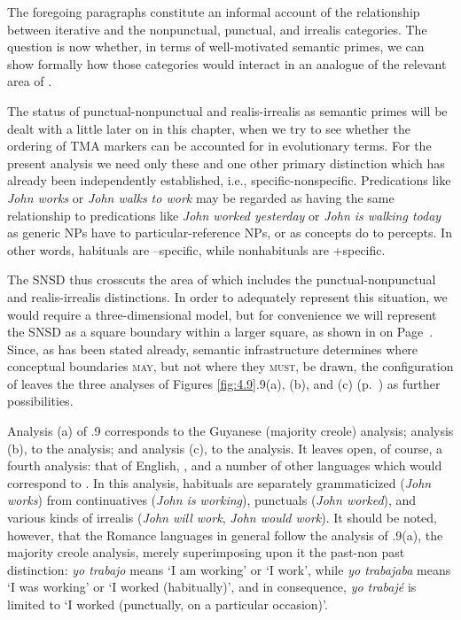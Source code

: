 The foregoing paragraphs constitute an informal account of the relationship between iterative and the nonpunctual, punctual, and irrealis categories. The question is now whether, in terms of well-motivated semantic primes, we can show formally how those categories would interact in an analogue of the relevant area of .

The status of punc\-tu\-al-nonpunctual and realis-irrealis as semantic primes will be dealt with a little later on in this chapter, when we try to see whether the ordering of TMA markers can be accounted for in evolutionary terms. For the present analysis we need only these and one other primary distinction which has already been independently established, i.e., specific-nonspecific. Predications like  \textit{John works} or
\textit{John walks to work} may be regarded as having the same relationship to predications like \textit{John worked yesterday} or \textit{John is walking today} as generic NPs have to particular-reference NPs, or as concepts do to percepts. In other words, habituals are --specific, while nonhabituals are +specific.

The SNSD thus crosscuts the area of  which includes the punctual-nonpunctual and realis-irrealis distinctions. In order to adequately represent this situation, we would require a three-dimensional model, but for convenience we will represent the SNSD as a square boundary within a larger square, as shown in  on Page~\pageref{fig:4.8}. Since, as has been stated already, semantic infrastructure determines where conceptual boundaries \textsc{may}, but not where they \textsc{must}, be drawn, the configuration of  leaves the three analyses of Figures \ref{fig:4.9}.9(a), (b), and (c) (p.~\pageref{fig:4.9}) as further possibilities.

Analysis (a) of .9 corresponds to the Guyanese (majority creole) analysis; analysis (b), to the  analysis; and analysis (c), to the  analysis. It leaves open, of course, a fourth analysis: that of English, , and a number of other languages which would correspond to . In this analysis, habituals are separately grammaticized (\textit{John works}) from continuatives (\textit{John is working}), punctuals (\textit{John worked}), and various kinds of irrealis (\textit{John will work}, \textit{John would work}). It should be noted, however, that the Romance languages in general follow the analysis of .9(a), the majority creole analysis, merely superimposing upon it the past-non past distinction:  \textit{yo  trabajo} means `I am working' or `I work', while \textit{yo trabajaba} means `I was working' or `I worked (habitually)', and in consequence, \textit{yo trabajé} is limited to `I worked (punctually, on a particular occasion)'.\\\\

